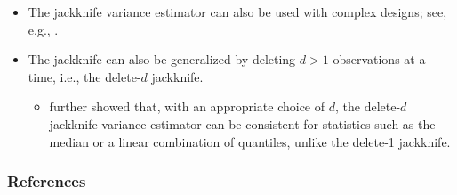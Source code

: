 \documentclass{my_eth_beamer}
\numberwithin{equation}{section}
\begin{document}
\begin{frame}
    \begin{itemize}
    \setlength{\itemsep}{10pt}
        \item The jackknife variance estimator can also be used with
            \alert{complex designs}; see, e.g., \citet[][Chapter 4]{wolter_2007}.
        \item The jackknife can also be generalized by deleting $d>1$
            observations at a time, i.e., the \alert{delete-$d$ jackknife}.
            \vspace{0.5em}
            \begin{itemize}
            \setlength{\itemsep}{2pt}
                \item[\goto] \citet{shao_wu_1989} further showed that, with an
                    appropriate choice of $d$, the delete-$d$ jackknife
                    variance estimator can be consistent for statistics such as
                    the median or a linear combination of quantiles, unlike the
                    delete-1 jackknife.
            \end{itemize}
    \end{itemize}
\end{frame}

\setcounter{section}{\the\numexpr\value{section}-1\relax}
\begin{frame}
    \frametitle{References}
    {\footnotesize
        
        
    }
\end{frame}

\lastpage
\end{document}
